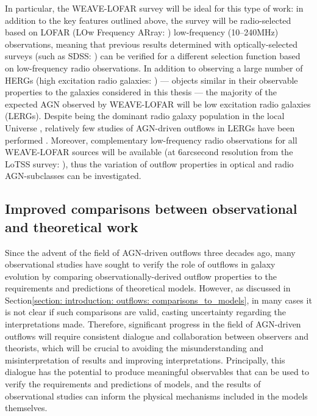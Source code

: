 In particular, the WEAVE-LOFAR survey \citep{Smith2016, Shoko2023} will be ideal for this type of work: in addition to the key features outlined above, the survey will be radio-selected based on LOFAR (LOw Frequency ARray: \citealt{vanHaarlem2013}) low-frequency (10--240\;MHz) observations, meaning that previous results determined with optically-selected surveys (such as SDSS: \citealt{York2000}) can be verified for a different selection function based on low-frequency radio observations. In addition to observing a large number of HERGs (high excitation radio galaxies: \citealt{Laing1994, Tadhunter1998, Best2012}) --- objects similar in their observable properties to the galaxies considered in this thesis --- the majority of the expected AGN observed by WEAVE-LOFAR will be low excitation radio galaxies (LERGs). Despite being the dominant radio galaxy population in the local Universe \citep{Hardcastle2007}, relatively few studies of AGN-driven outflows in LERGs have been performed \citep{Ruffa2022}. Moreover, complementary low-frequency radio observations for all WEAVE-LOFAR sources will be available (at 6\;arcsecond resolution from the LoTSS survey: \citealt{Shimwell2017}), thus the variation of outflow properties in optical and radio AGN-subclasses can be investigated.

\subsection{Improved comparisons between observational and theoretical work}
\label{section: conclusions_and_future_work: future_work: improved_comparisons}

Since the advent of the field of AGN-driven outflows three decades ago, many observational studies have sought to verify the role of outflows in galaxy evolution by comparing observationally-derived outflow properties to the requirements and predictions of theoretical models. However, as discussed in Section\;\ref{section: introduction: outflows: comparisons_to_models}, in many cases it is not clear if such comparisons are valid, casting uncertainty regarding the interpretations made. Therefore, significant progress in the field of AGN-driven outflows will require consistent dialogue and collaboration between observers and theorists, which will be crucial to avoiding the misunderstanding and misinterpretation of results and improving interpretations. Principally, this dialogue has the potential to produce meaningful observables that can be used to verify the requirements and predictions of models, and the results of observational studies can inform the physical mechanisms included in the models themselves.

